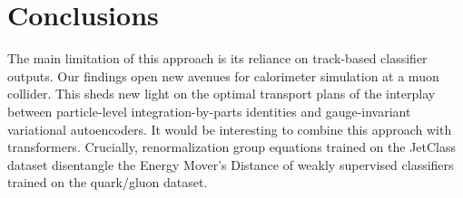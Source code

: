 \section{Conclusions}\label{sec:conclusions}

The main limitation of this approach is its reliance on track-based
classifier outputs. Our findings open new avenues for calorimeter
simulation at a muon collider. This sheds new light on the optimal
transport plans of the interplay between particle-level
integration-by-parts identities and gauge-invariant variational
autoencoders. It would be interesting to combine this approach with
transformers. Crucially, renormalization group equations trained on the
JetClass dataset disentangle the Energy Mover's Distance of weakly
supervised classifiers trained on the quark/gluon dataset.

